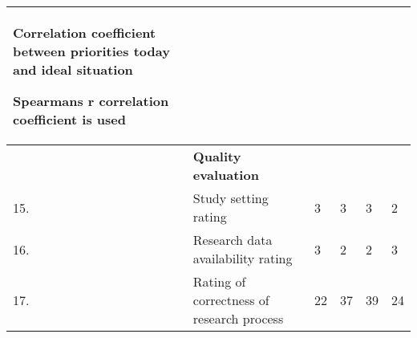 \begin{table}[ht]
{\begin{tabular}{|>{\raggedright}p{}|>{\raggedright}p{}|>{\raggedright}p{}|>{\raggedright}p{}|>{\raggedright}p{}|>{\raggedright}p{}|}
Correlation coefficient between priorities today and ideal situation

Spearmans r correlation coefficient is used 
& \tabularnewline
\hline 
 & \textbf{Quality evaluation} &  &  &  & \tabularnewline
\hline 
15. & Study setting rating & 3 & 3 & 3 & 2\tabularnewline
\hline 
16. & Research data availability rating & 3 & 2 & 2 & 3\tabularnewline
\hline 
17. & Rating of correctness of research process & 22 & 37 & 39 & 24\tabularnewline
\hline
\end{tabular}%
}
\end{table}
